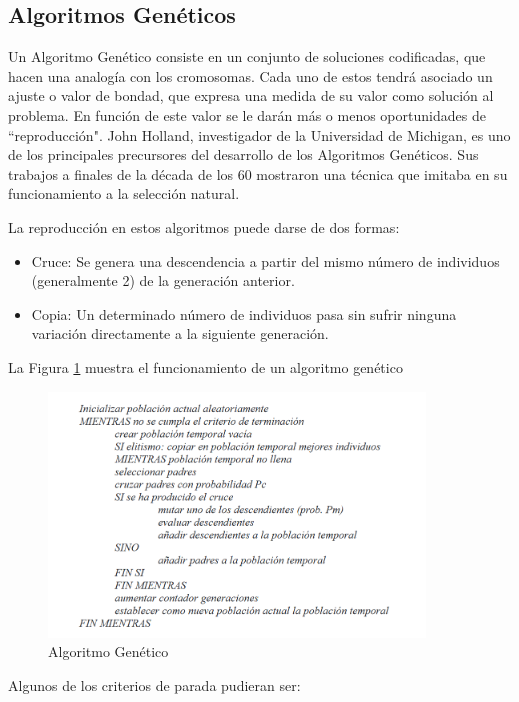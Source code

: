 \documentclass[a4paper,12pt]{book}
\begin{document}
	\subsection{Algoritmos Genéticos} \label{sub:Genetico}
		Un Algoritmo Genético \cite{AlgGen} consiste en un conjunto de soluciones codificadas, que hacen una analogía con los cromosomas.  Cada uno  de  estos tendrá  asociado  un  ajuste o valor de bondad, que expresa una medida de su valor como solución al problema. En función de este valor se le darán más o menos oportunidades de ``reproducción". John Holland, investigador de la Universidad de Michigan, es uno de los principales precursores del desarrollo de los Algoritmos Genéticos. Sus trabajos a finales de la década de los 60 mostraron una técnica que imitaba en su funcionamiento a la selección natural.
		
		La reproducción en estos algoritmos puede darse de dos formas:
		
		\begin{itemize}
			\item Cruce: Se genera una descendencia a partir del mismo número de individuos (generalmente 2) de la generación anterior. 
			\item Copia: Un determinado número de individuos pasa sin sufrir ninguna variación directamente a la siguiente generación.
		\end{itemize}
	
		La Figura \ref{AlgoritmoeGenetico} muestra el funcionamiento de un algoritmo genético
	
		\begin{figure}[h]
			\centering
			\includegraphics[width=10cm]{./Graphics/AlgoritmoGenetico.png}
			\caption{Algoritmo Genético}
			\label{AlgoritmoeGenetico}
		\end{figure}
	
		Algunos de los criterios de parada pudieran ser:
		
\end{document}
